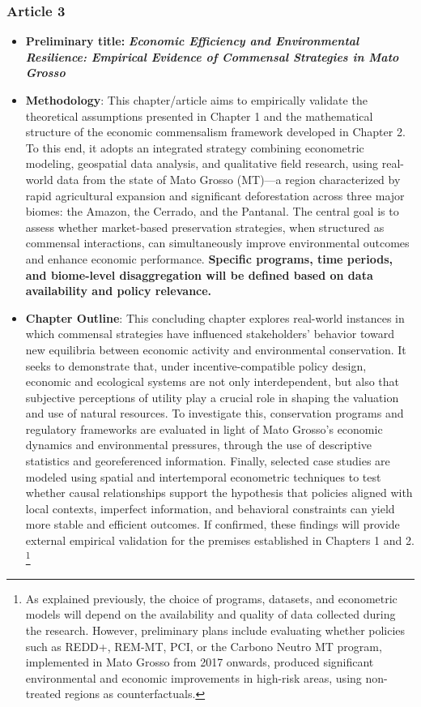 \subsubsection{Article 3}

\begin{itemize}
  
  \item \textbf{Preliminary title:} \emph{\textbf{Economic Efficiency and Environmental Resilience: Empirical Evidence of Commensal Strategies in Mato Grosso}}

  \item \textbf{Methodology}: This chapter/article aims to empirically validate the theoretical assumptions presented in Chapter 1 and the mathematical structure of the economic commensalism framework developed in Chapter 2. To this end, it adopts an integrated strategy combining econometric modeling, geospatial data analysis, and qualitative field research, using real-world data from the state of Mato Grosso (MT)—a region characterized by rapid agricultural expansion and significant deforestation across three major biomes: the Amazon, the Cerrado, and the Pantanal. The central goal is to assess whether market-based preservation strategies, when structured as commensal interactions, can simultaneously improve environmental outcomes and enhance economic performance. \textbf{Specific programs, time periods, and biome-level disaggregation will be defined based on data availability and policy relevance.}

  \item \textbf{Chapter Outline}: This concluding chapter explores real-world instances in which commensal strategies have influenced stakeholders' behavior toward new equilibria between economic activity and environmental conservation. It seeks to demonstrate that, under incentive-compatible policy design, economic and ecological systems are not only interdependent, but also that subjective perceptions of utility play a crucial role in shaping the valuation and use of natural resources. To investigate this, conservation programs and regulatory frameworks are evaluated in light of Mato Grosso’s economic dynamics and environmental pressures, through the use of descriptive statistics and georeferenced information. Finally, selected case studies are modeled using spatial and intertemporal econometric techniques to test whether causal relationships support the hypothesis that policies aligned with local contexts, imperfect information, and behavioral constraints can yield more stable and efficient outcomes. If confirmed, these findings will provide external empirical validation for the premises established in Chapters 1 and 2.%
  \footnote{As explained previously, the choice of programs, datasets, and econometric models will depend on the availability and quality of data collected during the research. However, preliminary plans include evaluating whether policies such as REDD+, REM-MT, PCI, or the Carbono Neutro MT program, implemented in Mato Grosso from 2017 onwards, produced significant environmental and economic improvements in high-risk areas, using non-treated regions as counterfactuals.}


\end{itemize}
